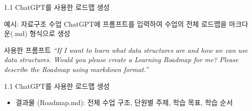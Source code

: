 \documentclass[aspectratio=169,xcolor=dvipsnames]{beamer}
\begin{document}
\begin{frame}{1.1 ChatGPT를 사용한 로드맵 생성}

  \begin{block}{예시: 자료구조 수업}
    ChatGPT에 프롬프트를 입력하여 수업의 전체 로드맵을 마크다운(.md) 형식으로 생성
  \end{block}

  \vspace{0.3cm}

  \begin{alertblock}{사용한 프롬프트}
    \textit{``If I want to learn what data structures are and how we can use data structures. Would you please create a Learning Roadmap for me? Please describe the Roadmap using markdown format.''}
  \end{alertblock}

  \vspace{0.3cm}

\end{frame}




\begin{frame}[fragile]{1.1 ChatGPT를 사용한 로드맵 생성}
  \begin{itemize}
    \item 결과물 (Roadmap.md): 전체 수업 구조, 단원별 주제, 학습 목표, 학습 순서
  \end{itemize}
  \begin{center}
  \end{center}
\end{frame}
\end{document}
